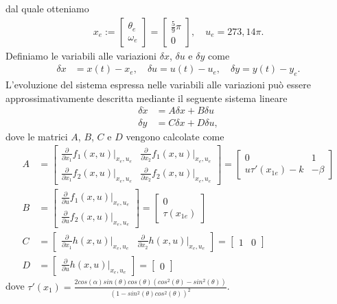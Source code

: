 \documentclass[a4paper, 11pt]{article}
\begin{document}
%
dal quale otteniamo
%
\begin{align}
	x_e := \begin{bmatrix}
		\theta_e \\
		\omega_e
	\end{bmatrix} = \begin{bmatrix}
		\frac{5}{9}\pi \\
		0
	\end{bmatrix},  \quad u_e = 273,14 \pi.\label{eq:equilibirum_pair}
\end{align}
%
Definiamo le variabili alle variazioni $\delta x$, $\delta u$ e $\delta y$ come 
%
\begin{align*}
	\delta x &= x(t) - x_e, 
	\quad
	\delta u = u(t) - u_e, 
	\quad
	\delta y = y(t) - y_e.
\end{align*}
%
L'evoluzione del sistema espressa nelle variabili alle variazioni pu\`o essere approssimativamente descritta mediante il seguente sistema lineare
%
\begin{subequations}\label{eq:linearized_system}
\begin{align}
	\delta \dot{x} &= A\delta x + B\delta u
	\\
	\delta y &= C\delta x + D\delta u,
\end{align}
\end{subequations}
%
dove le matrici $A$, $B$, $C$ e $D$ vengono calcolate come
%
\newcommand{\pdv}[2]{\frac{\partial}{\partial #1}#2(x,u)|_{x_e,u_e}}
\begin{subequations}\label{eq:matrices}
\begin{align}
	A &=\begin{bmatrix}
		\pdv{x_1}{f_1} & \pdv{x_2}{f_1} \\
		\pdv{x_1}{f_2} & \pdv{x_2}{f_2}
	\end{bmatrix} = \begin{bmatrix}
		0 & 1 \\
		u\tau'(x_{1e}) - k & - \beta
	\end{bmatrix}
	\\
	B &=\begin{bmatrix}
		\pdv{u}{f_1} \\
		\pdv{u}{f_2}
	\end{bmatrix} = \begin{bmatrix}
		0 \\
		\tau(x_{1e})
	\end{bmatrix}
	\\
	C &=\begin{bmatrix}
		\pdv{x_1}{h} & \pdv{x_2}{h}
	\end{bmatrix} = \begin{bmatrix}
		1 & 0
	\end{bmatrix}
	\\
	D &= \begin{bmatrix}
		\pdv{u}{h}
	\end{bmatrix} = \begin{bmatrix}
		0
	\end{bmatrix}
\end{align}
\end{subequations}
dove $\tau'(x_1)=\frac{2cos(\alpha)sin(\theta)cos(\theta)(cos^2(\theta)-sin^2(\theta))}{(1-sin^2(\theta)cos^2(\theta))^2}$.
\end{document}
